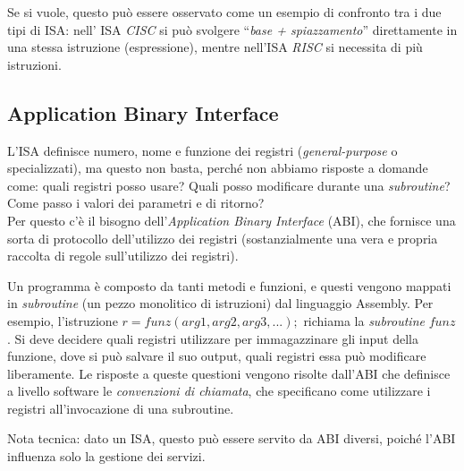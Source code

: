 \documentclass[class=book, crop=false, oneside]{standalone}
\begin{document}
Se si vuole, questo può essere osservato come un esempio di confronto tra i due tipi di ISA: nell’ ISA \emph{CISC} si può svolgere “\emph{base + spiazzamento}” direttamente in una stessa istruzione (espressione), mentre nell'ISA \emph{RISC} si necessita di più istruzioni.

\subsection{Application Binary Interface}
L'ISA definisce numero, nome e funzione dei registri (\emph{general-purpose} o  specializzati), ma questo non basta, perché non abbiamo risposte a domande come: quali registri posso usare? Quali posso modificare durante una \emph{subroutine}? Come passo i valori dei parametri e di ritorno?\\
Per questo c’è il bisogno dell'\emph{Application Binary Interface} (ABI), che fornisce una sorta di protocollo dell’utilizzo dei registri (sostanzialmente una vera e propria raccolta di regole sull’utilizzo dei registri).

Un programma è composto da tanti metodi e funzioni, e questi vengono mappati in \emph{subroutine} (un pezzo monolitico di istruzioni) dal linguaggio Assembly. Per esempio, l’istruzione $r=funz(arg1, arg2, arg3, ...);$ richiama la \emph{subroutine} \(funz\). Si deve decidere quali registri utilizzare per immagazzinare gli input della funzione, dove si può salvare il suo output, quali registri essa può modificare liberamente. Le risposte a queste questioni vengono risolte dall’ABI che definisce a livello software le \emph{convenzioni di chiamata}, che specificano come utilizzare i registri all’invocazione di una subroutine.

Nota tecnica: dato un ISA, questo può essere servito da ABI diversi, poiché l’ABI influenza solo la gestione dei servizi.
\end{document}
